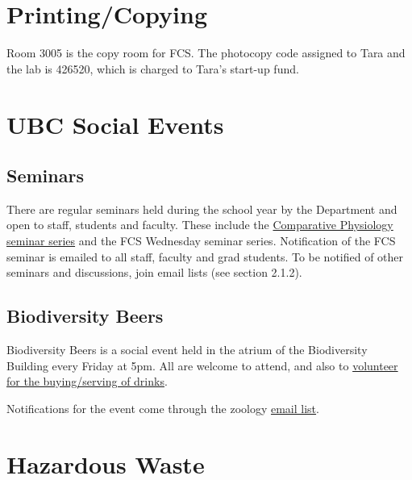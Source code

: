 \documentclass[
]{book}
\begin{document}
\hypertarget{printing}{%
\section*{Printing/Copying}\label{printing}}

Room 3005 is the copy room for FCS. The photocopy code assigned to Tara and the lab is 426520, which is charged to Tara's start-up fund.

\hypertarget{ubcsocial}{%
\section*{UBC Social Events}\label{ubcsocial}}

\hypertarget{seminars}{%
\subsection{Seminars}\label{seminars}}

There are regular seminars held during the school year by the Department and open to staff, students and faculty. These include the \href{https://zoology.ubc.ca/events/weekly-seminars/friday-comparative-physiology-invited-speaker-seminar}{Comparative Physiology seminar series} and the FCS Wednesday seminar series. Notification of the FCS seminar is emailed to all staff, faculty and grad students. To be notified of other seminars and discussions, join email lists (see section 2.1.2).

\hypertarget{biodiversity-beers}{%
\subsection{Biodiversity Beers}\label{biodiversity-beers}}

Biodiversity Beers is a social event held in the atrium of the Biodiversity Building every Friday at 5pm. All are welcome to attend, and also to \href{https://blogs.ubc.ca/biodiversitysocial/volunteer-information/}{volunteer for the buying/serving of drinks}.

Notifications for the event come through the zoology \protect\hyperlink{emaillists}{email list}.

\hypertarget{hazardous-waste}{%
\section{Hazardous Waste}\label{hazardous-waste}}
\end{document}
